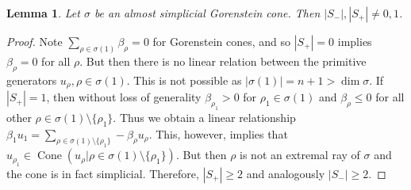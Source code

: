 \documentclass[reqno, 12pt]{amsart}
\newtheorem{lemma}[theorem]{Lemma}
\theoremstyle{definition}
\numberwithin{equation}{section}
\newcommand{\cone}{\operatorname{Cone}}
\begin{document}
\begin{lemma}
    \label{Lem:AlmGorAtleast2eachset}
    Let $\sigma$ be an almost simplicial Gorenstein cone. Then $|S_-|,|S_+|\neq 0,1$.
\end{lemma}
\begin{proof}
    Note $\sum_{\rho\in \sigma(1)}\beta_\rho=0$ for Gorenstein cones, and so $|S_+|=0$ implies $\beta_\rho=0$ for all $\rho$. But then there is no linear relation between the primitive generators $u_\rho, \rho\in \sigma(1)$. This is not possible as $|\sigma(1)|=n+1>\dim \sigma$. If $|S_+|=1$, then without loss of generality $\beta_{\rho_1}>0$ for $\rho_1\in \sigma(1)$ and $\beta_\rho\le 0$ for all other $\rho\in \sigma(1)\setminus\{\rho_1\}$. Thus we obtain a linear relationship $\beta_1 u_1=\sum_{\rho\in\sigma(1)\setminus\{\rho_1\}}-\beta_\rho u_\rho$. This, however, implies that $u_{\rho_1}\in \cone(u_\rho\vert\rho\in \sigma(1)\setminus \{\rho_1\})$. But then $\rho$ is not an extremal ray of $\sigma$ and the cone is in fact simplicial. Therefore, $|S_+|\ge 2$ and analogously $|S_-|\ge 2$.
\end{proof}
\end{document}
